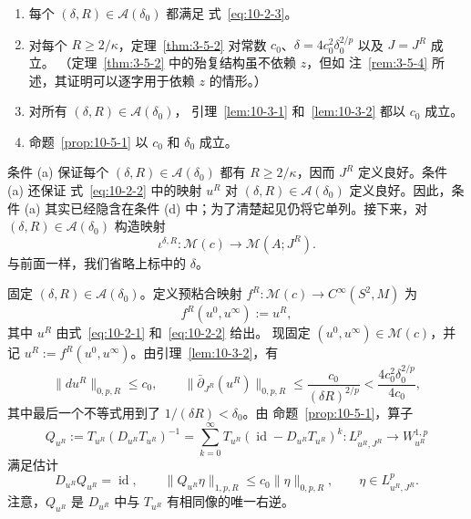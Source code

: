 \begin{enumerate}[label=(\alph*)]
\item 每个 $(\delta,R)\in\mathcal A(\delta_0)$ 都满足
式~\eqref{eq:10-2-3}。

\item 对每个 $R\ge2/\kappa$，定理~\ref{thm:3-5-2} 对常数
$c_0$、$\delta=4c_0^2\delta_0^{2/p}$ 以及 $J=J^R$ 成立。
（定理~\ref{thm:3-5-2} 中的殆复结构虽不依赖 $z$，但如
注~\ref{rem:3-5-4} 所述，其证明可以逐字用于依赖 $z$ 的情形。）

\item 对所有 $(\delta,R)\in\mathcal A(\delta_0)$，
引理~\ref{lem:10-3-1} 和~\ref{lem:10-3-2} 都以 $c_0$ 成立。

\item 命题~\ref{prop:10-5-1} 以 $c_0$ 和 $\delta_0$ 成立。
\end{enumerate}

条件 (a) 保证每个 $(\delta,R)\in\mathcal A(\delta_0)$ 都有
$R\ge2/\kappa$，因而 $J^R$ 定义良好。条件 (a) 还保证
式~\eqref{eq:10-2-2} 中的映射 $u^R$ 对
$(\delta,R)\in\mathcal A(\delta_0)$ 定义良好。因此，条件 (a)
其实已经隐含在条件 (d) 中；为了清楚起见仍将它单列。接下来，对
$(\delta,R)\in\mathcal A(\delta_0)$ 构造映射
\[
  \iota^{\delta,R}:\mathcal M(c)\longrightarrow
  \mathcal M(A;J^R).
\]
与前面一样，我们省略上标中的 $\delta$。

固定 $(\delta,R)\in\mathcal A(\delta_0)$。定义预粘合映射
$f^R:\mathcal M(c)\to C^\infty(S^2,M)$ 为
\begin{equation}\label{eq:10-5-6}
  f^R(u^0,u^\infty):=u^R,
\end{equation}
其中 $u^R$ 由式~\eqref{eq:10-2-1} 和~\eqref{eq:10-2-2} 给出。
现固定 $(u^0,u^\infty)\in\mathcal M(c)$，并记
$u^R:=f^R(u^0,u^\infty)$。由引理~\ref{lem:10-3-2}，有
\begin{equation}\label{eq:10-5-7}
  \|du^R\|_{0,p,R}\le c_0,
  \qquad
  \|\bar\partial_{J^R}(u^R)\|_{0,p,R}
  \le\frac{c_0}{(\delta R)^{2/p}}
  <\frac{4c_0^2\delta_0^{2/p}}{4c_0},
\end{equation}
其中最后一个不等式用到了 $1/(\delta R)<\delta_0$。由
命题~\ref{prop:10-5-1}，算子
\[
  Q_{u^R}:=T_{u^R}(D_{u^R}T_{u^R})^{-1}
  =\sum_{k=0}^{\infty}T_{u^R}
    (\operatorname{id}-D_{u^R}T_{u^R})^k:
  L_{u^R,J^R}^p\longrightarrow W_{u^R}^{1,p}
\]
满足估计
\begin{equation}\label{eq:10-5-8}
  D_{u^R}Q_{u^R}=\operatorname{id},
  \qquad
  \|Q_{u^R}\eta\|_{1,p,R}\le c_0\|\eta\|_{0,p,R},
  \qquad \eta\in L_{u^R,J^R}^p.
\end{equation}
注意，$Q_{u^R}$ 是 $D_{u^R}$ 中与 $T_{u^R}$ 有相同像的唯一右逆。

